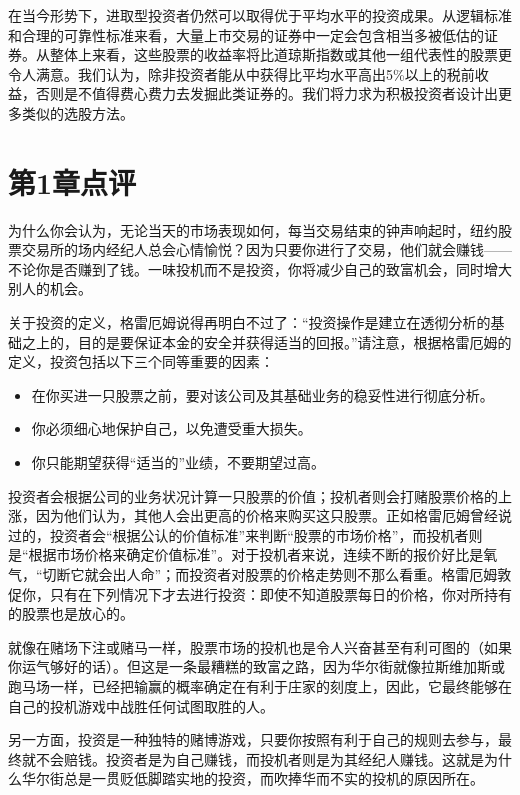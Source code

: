 \documentclass[12pt,oneside]{book}
\begin{document}
在当今形势下，进取型投资者仍然可以取得优于平均水平的投资成果。从逻辑标准和合理的可靠性标准来看，大量上市交易的证券中一定会包含相当多被低估的证券。从整体上来看，这些股票的收益率将比道琼斯指数或其他一组代表性的股票更令人满意。我们认为，除非投资者能从中获得比平均水平高出5\%以上的税前收益，否则是不值得费心费力去发掘此类证券的。我们将力求为积极投资者设计出更多类似的选股方法。





\section{第1章点评}
为什么你会认为，无论当天的市场表现如何，每当交易结束的钟声响起时，纽约股票交易所的场内经纪人总会心情愉悦？因为只要你进行了交易，他们就会赚钱——不论你是否赚到了钱。一味投机而不是投资，你将减少自己的致富机会，同时增大别人的机会。

关于投资的定义，格雷厄姆说得再明白不过了：“投资操作是建立在透彻分析的基础之上的，目的是要保证本金的安全并获得适当的回报。”请注意，根据格雷厄姆的定义，投资包括以下三个同等重要的因素：

\begin{itemize}
\item 在你买进一只股票之前，要对该公司及其基础业务的稳妥性进行彻底分析。
\item 你必须细心地保护自己，以免遭受重大损失。
\item 你只能期望获得“适当的”业绩，不要期望过高。
\end{itemize}


投资者会根据公司的业务状况计算一只股票的价值；投机者则会打赌股票价格的上涨，因为他们认为，其他人会出更高的价格来购买这只股票。正如格雷厄姆曾经说过的，投资者会“根据公认的价值标准”来判断“股票的市场价格”，而投机者则是“根据市场价格来确定价值标准”。对于投机者来说，连续不断的报价好比是氧气，“切断它就会出人命”；而投资者对股票的价格走势则不那么看重。格雷厄姆敦促你，只有在下列情况下才去进行投资：即使不知道股票每日的价格，你对所持有的股票也是放心的。

就像在赌场下注或赌马一样，股票市场的投机也是令人兴奋甚至有利可图的（如果你运气够好的话）。但这是一条最糟糕的致富之路，因为华尔街就像拉斯维加斯或跑马场一样，已经把输赢的概率确定在有利于庄家的刻度上，因此，它最终能够在自己的投机游戏中战胜任何试图取胜的人。

另一方面，投资是一种独特的赌博游戏，只要你按照有利于自己的规则去参与，最终就不会赔钱。投资者是为自己赚钱，而投机者则是为其经纪人赚钱。这就是为什么华尔街总是一贯贬低脚踏实地的投资，而吹捧华而不实的投机的原因所在。
\end{document}
